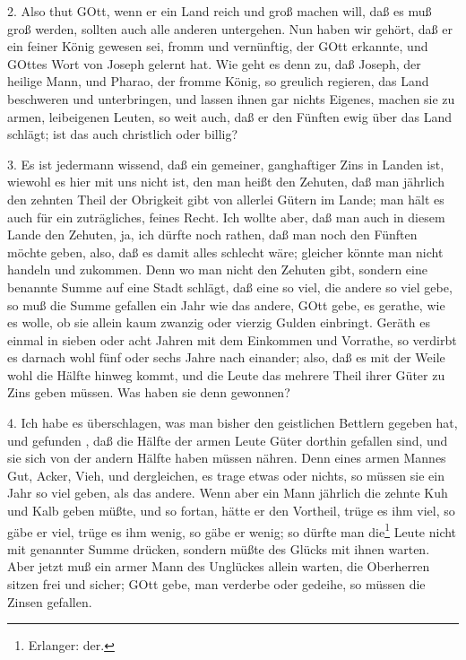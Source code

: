 2. Also thut GOtt, wenn er ein Land reich und groß machen will, daß es muß groß werden, sollten auch alle anderen untergehen. Nun haben wir gehört, daß er ein feiner König gewesen sei, fromm und vernünftig, der GOtt erkannte, und GOttes Wort von Joseph gelernt hat. Wie geht es denn zu, daß Joseph, der heilige Mann, und Pharao, der fromme König, so greulich regieren, das Land beschweren und unterbringen, und lassen ihnen gar nichts Eigenes, machen sie zu armen, leibeigenen Leuten, so weit auch, daß er den Fünften ewig über das Land schlägt; ist das auch christlich oder billig?

3. Es ist jedermann wissend, daß ein gemeiner, ganghaftiger Zins in Landen ist, wiewohl es hier mit uns nicht ist, den man heißt den Zehuten, daß man jährlich den zehnten Theil der Obrigkeit gibt von allerlei Gütern im Lande; man hält es auch für ein zuträgliches, feines Recht. Ich wollte aber, daß man auch in diesem Lande den Zehuten, ja, ich dürfte noch rathen, daß man noch den Fünften möchte geben, also, daß es damit alles schlecht wäre; gleicher könnte man nicht handeln und zukommen. Denn wo man nicht den Zehuten gibt, sondern eine benannte Summe auf eine Stadt schlägt, daß eine so viel, die andere so viel gebe, so muß die Summe gefallen ein Jahr wie das andere, GOtt gebe, es gerathe, wie es wolle, ob sie allein kaum zwanzig oder vierzig Gulden einbringt. Geräth es einmal in sieben oder acht Jahren mit dem Einkommen und Vorrathe, so verdirbt es darnach wohl fünf oder sechs Jahre nach einander; also, daß es mit der Weile wohl die Hälfte hinweg kommt, und die Leute das mehrere Theil ihrer Güter zu Zins geben müssen. Was haben sie denn gewonnen?

4. Ich habe es überschlagen, was man bisher den geistlichen Bettlern gegeben hat, und gefunden
, daß die Hälfte der armen Leute Güter dorthin gefallen sind, und sie sich von der andern Hälfte haben müssen nähren. Denn eines armen Mannes Gut, Acker, Vieh, und dergleichen, es trage etwas oder nichts, so müssen sie ein Jahr so viel geben, als das andere. Wenn aber ein Mann jährlich die zehnte Kuh und Kalb geben müßte, und so fortan, hätte er den Vortheil, trüge es ihm viel, so gäbe er viel, trüge es ihm wenig, so gäbe er wenig; so dürfte man die\footnote{Erlanger: der.} Leute nicht mit genannter Summe drücken, sondern müßte des Glücks mit ihnen warten. Aber jetzt muß ein armer Mann des Unglückes allein warten, die Oberherren sitzen frei und sicher; GOtt gebe, man verderbe oder gedeihe, so müssen die Zinsen gefallen.

